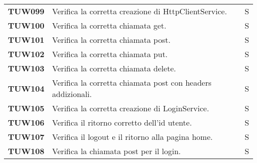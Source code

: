 \documentclass[../../piano-di-qualifica.tex]{subfiles}
\begin{document}
\begin{longtable}[H]{>{\centering\bfseries}m{3cm} >{}m{10cm} >{\centering\arraybackslash}m{3cm}}

  TUW099             & Verifica la corretta creazione di HttpClientService.                                                                & S                             \\

  TUW100             & Verifica la corretta chiamata get.                                                                                  & S                             \\

  TUW101             & Verifica la corretta chiamata post.                                                                                 & S                             \\

  TUW102             & Verifica la corretta chiamata put.                                                                                  & S                             \\

  TUW103             & Verifica la corretta chiamata delete.                                                                               & S                             \\

  TUW104             & Verifica la corretta chiamata post con headers addizionali.                                                         & S                             \\


  TUW105             & Verifica la corretta creazione di LoginService.                                                                     & S                             \\

  TUW106             & Verifica il ritorno corretto dell'id utente.                                                                        & S                             \\

  TUW107             & Verifica il logout e il ritorno alla pagina home.                                                                   & S                             \\

  TUW108             & Verifica la chiamata post per il login.                                                                             & S                             \\


\end{longtable}
\end{document}
